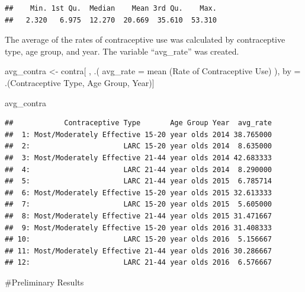 \documentclass[
]{article}
\newenvironment{Shaded}{\begin{snugshade}}{\end{snugshade}}
\newcommand{\AttributeTok}[1]{\textcolor[rgb]{0.77,0.63,0.00}{#1}}
\newcommand{\FunctionTok}[1]{\textcolor[rgb]{0.00,0.00,0.00}{#1}}
\newcommand{\NormalTok}[1]{#1}
\newcommand{\OtherTok}[1]{\textcolor[rgb]{0.56,0.35,0.01}{#1}}
\newcommand{\StringTok}[1]{\textcolor[rgb]{0.31,0.60,0.02}{#1}}
\begin{document}
\begin{verbatim}
##    Min. 1st Qu.  Median    Mean 3rd Qu.    Max. 
##   2.320   6.975  12.270  20.669  35.610  53.310
\end{verbatim}

The average of the rates of contraceptive use was calculated by
contraceptive type, age group, and year. The variable ``avg\_rate'' was
created.

\begin{Shaded}
\begin{Highlighting}[]
\NormalTok{avg\_contra }\OtherTok{\textless{}{-}}\NormalTok{ contra[ , .(}
    \AttributeTok{avg\_rate =} \FunctionTok{mean}\NormalTok{ (}\StringTok{\textasciigrave{}}\AttributeTok{Rate of Contraceptive Use}\StringTok{\textasciigrave{}}\NormalTok{)}
\NormalTok{  ), }
\NormalTok{  by }\OtherTok{=}\NormalTok{ .(}\StringTok{\textasciigrave{}}\AttributeTok{Contraceptive Type}\StringTok{\textasciigrave{}}\NormalTok{, }\StringTok{\textasciigrave{}}\AttributeTok{Age Group}\StringTok{\textasciigrave{}}\NormalTok{, Year)]}

\NormalTok{avg\_contra}
\end{Highlighting}
\end{Shaded}

\begin{verbatim}
##            Contraceptive Type       Age Group Year  avg_rate
##  1: Most/Moderately Effective 15-20 year olds 2014 38.765000
##  2:                      LARC 15-20 year olds 2014  8.635000
##  3: Most/Moderately Effective 21-44 year olds 2014 42.683333
##  4:                      LARC 21-44 year olds 2014  8.290000
##  5:                      LARC 21-44 year olds 2015  6.785714
##  6: Most/Moderately Effective 15-20 year olds 2015 32.613333
##  7:                      LARC 15-20 year olds 2015  5.605000
##  8: Most/Moderately Effective 21-44 year olds 2015 31.471667
##  9: Most/Moderately Effective 15-20 year olds 2016 31.408333
## 10:                      LARC 15-20 year olds 2016  5.156667
## 11: Most/Moderately Effective 21-44 year olds 2016 30.286667
## 12:                      LARC 21-44 year olds 2016  6.576667
\end{verbatim}

\#Preliminary Results
\end{document}
